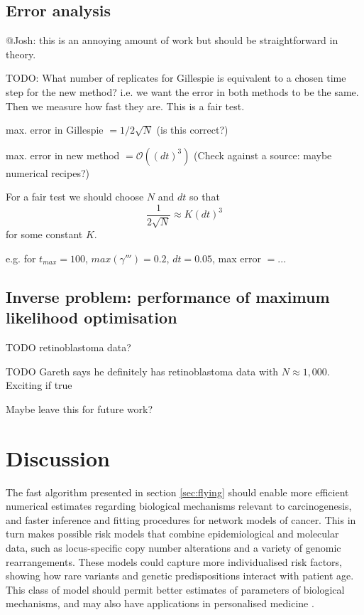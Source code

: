 \documentclass{article}
\begin{document}
\subsection*{Error analysis}

@Josh: this is an annoying amount of work but should be straightforward in
theory.

TODO: What number of replicates for Gillespie is equivalent to a chosen
time step for the new method? i.e. we want the error in both methods to be the
same. Then we measure how fast they are. This is a fair test.

max. error in Gillespie $= 1 / 2 \sqrt{N}$ (is this correct?)

max. error in new method $= \mathcal{O}((dt)^3)$ (Check against a source:
maybe numerical recipes?)

For a fair test we should choose $N$ and $dt$ so that
\begin{equation}
    \frac{1}{2\sqrt{N}} \approx K (dt)^3
\end{equation}
for some constant $K$.

e.g. for $t_{max} = 100$, $max(\gamma''') = 0.2$, $dt = 0.05$, max error $ = ...$


\subsection{Inverse problem: performance of maximum likelihood optimisation}

TODO retinoblastoma data?

TODO Gareth says he definitely has retinoblastoma data with $N\approx1,000$.
Exciting if true

Maybe leave this for future work?

\section{Discussion}


The fast algorithm presented in section \ref{sec:flying} should enable more efficient numerical
estimates regarding biological mechanisms relevant to carcinogenesis, and faster
inference and fitting procedures for network models of cancer. This in turn
makes possible risk models that combine epidemiological and molecular data, such as locus-specific copy number
alterations and a variety of genomic rearrangements. These models could
capture more individualised risk factors, showing how rare variants and genetic predispositions interact
with patient age. This class of model should permit better estimates of
parameters of biological mechanisms, and may also have applications in
personalised medicine \cite{patersonbozic2020colorectal}.
\end{document}
